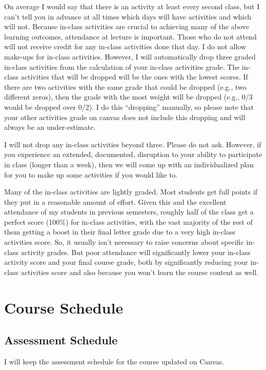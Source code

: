 \documentclass[11pt,letterpaper,final]{article}
\begin{document}
On average I would say that there is an activity at least every second class, but I can't tell you in advance at all times which days will have activities and which will not. Because in-class activities are crucial to achieving many of the above learning outcomes, attendance at lecture is important. Those who do not attend will not receive credit for any in-class activities done that day. I do not allow make-ups for in-class activities. However, I will automatically drop three graded in-class activities from the calculation of your in-class activities grade. The in-class activities that will be dropped will be the ones with the lowest scores. If there are two activities with the same grade that could be dropped (e.g., two different zeros), then the grade with the most weight will be dropped (e.g., 0/3 would be dropped over 0/2). I do this ``dropping'' manually, so please note that your other activities grade on canvas does not include this dropping and will always be an under-estimate.

I will not drop any in-class activities beyond three. Please do not ask. However, if you experience an extended, documented, disruption to your ability to participate in class (longer than a week), then we will come up with an individualized plan for you to make up some activities if you would like to.

Many of the in-class activities are lightly graded. Most students get full points if they put in a reasonable amount of effort. Given this and the excellent attendance of my students in previous semesters, roughly half of the class get a perfect score (100\%) for in-class activities, with the vast majority of the rest of them getting a boost in their final letter grade due to a very high in-class activities score. So, it usually isn't necessary to raise concerns about specific in-class activity grades. But poor attendance will significantly lower your in-class activity score and your final course grade, both by significantly reducing your in-class activities score and also because you won't learn the course content as well.

\section{Course Schedule}

\subsection{Assessment Schedule}
I will keep the assessment schedule for the course updated on Canvas. 
\end{document}
